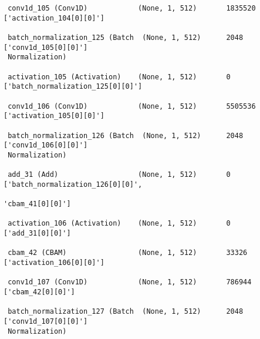 \begin{lstlisting}
 conv1d_105 (Conv1D)            (None, 1, 512)       1835520     ['activation_104[0][0]']         
                                                                                                  
 batch_normalization_125 (Batch  (None, 1, 512)      2048        ['conv1d_105[0][0]']             
 Normalization)                                                                                   
                                                                                                  
 activation_105 (Activation)    (None, 1, 512)       0           ['batch_normalization_125[0][0]']
                                                                                                  
 conv1d_106 (Conv1D)            (None, 1, 512)       5505536     ['activation_105[0][0]']         
                                                                                                  
 batch_normalization_126 (Batch  (None, 1, 512)      2048        ['conv1d_106[0][0]']             
 Normalization)                                                                                   
                                                                                                  
 add_31 (Add)                   (None, 1, 512)       0           ['batch_normalization_126[0][0]',
                                                                  'cbam_41[0][0]']                
                                                                                                  
 activation_106 (Activation)    (None, 1, 512)       0           ['add_31[0][0]']                 
                                                                                                  
 cbam_42 (CBAM)                 (None, 1, 512)       33326       ['activation_106[0][0]']         
                                                                                                  
 conv1d_107 (Conv1D)            (None, 1, 512)       786944      ['cbam_42[0][0]']                
                                                                                                  
 batch_normalization_127 (Batch  (None, 1, 512)      2048        ['conv1d_107[0][0]']             
 Normalization)                                                                                   
                                                                                                  

\end{lstlisting}
